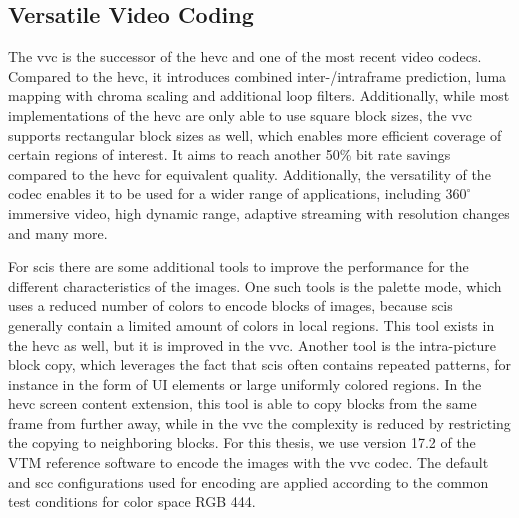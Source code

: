 \subsection{Versatile Video Coding}
\label{subsec:vvc}

The \gls{vvc} \cite{vvc_2021} is the successor of the \gls{hevc} and one of the most recent video codecs.
Compared to the \gls{hevc}, it introduces combined inter-/intraframe prediction, luma mapping with chroma scaling and additional loop filters.
Additionally, while most implementations of the \gls{hevc} are only able to use square block sizes, the \gls{vvc} supports rectangular block sizes as well, which enables more efficient coverage of certain regions of interest.
It aims to reach another 50\% bit rate savings compared to the \gls{hevc} for equivalent quality.
Additionally, the versatility of the codec enables it to be used for a wider range of applications, including $360^{\circ}$ immersive video, high dynamic range, adaptive streaming with resolution changes and many more.

For \glspl{sci} there are some additional tools to improve the performance for the different characteristics of the images.
One such tools is the palette mode, which uses a reduced number of colors to encode blocks of images, because \glspl{sci} generally contain a limited amount of colors in local regions.
This tool exists in the \gls{hevc} as well, but it is improved in the \gls{vvc}.
Another tool is the intra-picture block copy, which leverages the fact that \glspl{sci} often contains repeated patterns, for instance in the form of UI elements or large uniformly colored regions.
In the \gls{hevc} screen content extension, this tool is able to copy blocks from the same frame from further away, while in the \gls{vvc} the complexity is reduced by restricting the copying to neighboring blocks.
For this thesis, we use version 17.2 of the VTM reference software \cite{vvc_software_2022} to encode the images with the \gls{vvc} codec.
The default and \gls{scc} \cite{config_vvc_both_2020} configurations used for encoding are applied according to the common test conditions for color space RGB 444.


